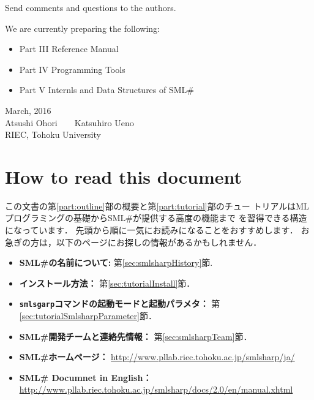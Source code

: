 \documentclass{jbook}
\newif\ifjp
\newcommand{\txt}[2]{#2}
\newcommand{\authors}
{\txt{大堀\ \ 淳\mbox{\ \ \ \ }上野 雄大
\\
東北大学 電気通信研究所
}
{Atsushi Ohori\mbox{\ \ \ \ }Katsuhiro Ueno
\\
RIEC, Tohoku University
}
}
\newcommand{\smlsharp}{SML\#}
\newcommand{\documentUrlEn}{\url{http://www.pllab.riec.tohoku.ac.jp/smlsharp/docs/2.0/en/manual.xhtml}}
\begin{document}
	Send comments and questions to the authors.

\bigskip
\bigskip

We are currently preparing the following:
\begin{itemize}
\item Part III Reference Manual
\item Part IV Programming Tools
\item Part V  Internls and Data Structures of \smlsharp{}
\end{itemize}
\fi%

\begin{flushright}
\txt{
2016年3月\\
\authors
}
{
March, 2016\\
\authors
}
\end{flushright}

\chapter{\txt{本書の使い方}{How to read this document}}

\ifjp%
    この文書の第\ref{part:outline}部の概要と第\ref{part:tutorial}部のチュー
トリアルはMLプログラミングの基礎から\smlsharp{}が提供する高度の機能まで
を習得できる構造になっています．
	先頭から順に一気にお読みになることをおすすめします．
	お急ぎの方は，以下のページにお探しの情報があるかもしれません．
\begin{itemize}
\item {\bf \smlsharp{}の名前について:}
第\ref{sec:smlsharpHistory}節.
\item {\bf インストール方法：}
第\ref{sec:tutorialInstall}節．
\item {\bf {\tt smlsgarp}コマンドの起動モードと起動パラメタ：}
第\ref{sec:tutorialSmlsharpParameter}節．
\item {\bf \smlsharp{}開発チームと連絡先情報：} 第\ref{sec:smlsharpTeam}節．
\item {\bf \smlsharp{}ホームページ：}
\url{http://www.pllab.riec.tohoku.ac.jp/smlsharp/ja/}
\item {\bf \smlsharp{} Documnet in English：}
\documentUrlEn
\end{itemize}   
\end{document}
